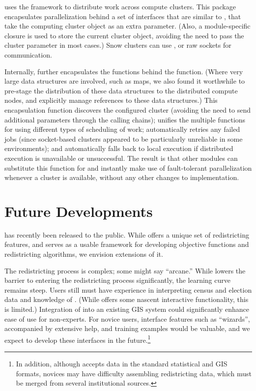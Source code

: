 \documentclass[article]{JSSstyle/jss}
\begin{document}
 uses the  \citep{Tierney07} framework to distribute work across compute clusters. This package 
encapsulates parallelization behind a set of interfaces that are similar to , that take the computing cluster object as an extra parameter. (Also, a module-specific closure is used to store the current cluster object, avoiding the need to pass the cluster parameter in most cases.) Snow clusters can use  ,  or raw sockets for communication. 

Internally,  further encapsulates the   functions behind  the  function. 
(Where very large data structures are involved, such as maps, we also found it worthwhile 
to pre-stage the distribution of these data structures to the distributed compute nodes, and explicitly manage references to these data structures.) 
This encapsulation function discovers the configured cluster (avoiding the need to send additional parameters through the calling chains); 
unifies the multiple  functions for using different types of scheduling of work;  automatically retries any failed jobs 
(since socket-based clusters appeared to be particularly unreliable in some environments); and automatically falls back to local execution if distributed 
execution is unavailable or unsuccessful. The result is that other  modules can substitute this function for 
 and instantly make use of fault-tolerant parallelization whenever a cluster is available, 
without any other changes to implementation.

\section{Future Developments}

 has recently been released to the public.  While  offers 
a unique set of redistricting features, and serves as a usable framework for developing objective functions and redistricting algorithms, we envision extensions of it.

The redistricting process is complex; some might say ``arcane.'' 
While  lowers the barrier to entering the redistricting process significantly, the learning curve remains steep. Users still must have experience in interpreting census and election data and knowledge of . (While  offers some nascent interactive functionality, this is limited.)  Integration of  into an existing GIS system could significantly enhance ease of use for non-experts. For novice users, interface features such as ``wizards'', accompanied by extensive help, and training 
examples would be valuable, and we expect to develop these interfaces in the future.\footnote{In addition, although  
accepts data in the standard statistical and GIS formats, novices may have difficulty assembling redistricting 
data, which must be merged from several institutional sources.} 
\end{document}
